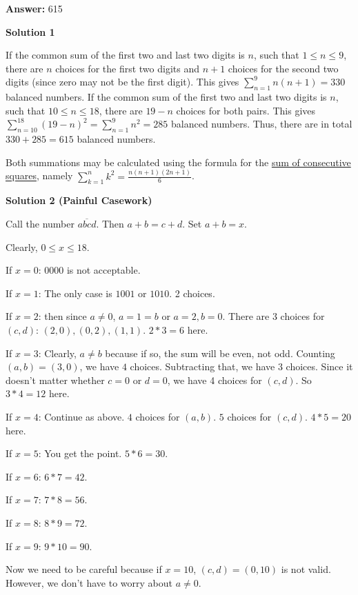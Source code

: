 \begin{enumerate}
 
 \textbf{Answer: }615



\textbf{Solution 1}

If the common sum of the first two and last two digits is $n$, such that $1 \leq n \leq 9$, there are $n$ choices for the first two digits and $n + 1$ choices for the second two digits (since zero may not be the first digit).  This gives $\sum_{n = 1}^9 n(n + 1) = 330$ balanced numbers.  If the common sum of the first two and last two digits is $n$, such that $10 \leq n \leq 18$, there are $19 - n$ choices for both pairs.  This gives $\sum_{n = 10}^{18} (19 - n)^2 = \sum_{n = 1}^9 n^2 = 285$ balanced numbers.  Thus, there are in total $330 + 285 = \boxed{615}$ balanced numbers.

 Both summations may be calculated using the formula for the \href{https://artofproblemsolving.com/wiki/index.php?title=Perfect\_square}{sum of consecutive squares}, namely $\sum_{k=1}^n k^2 = \frac{n(n+1)(2n+1)}{6}$.

 



\textbf{Solution 2 (Painful Casework)}

Call the number $\overline{abcd}$. Then $a+b=c+d$. Set $a+b=x$.

 Clearly, $0\le x \le18$.

 If $x=0$: $0000$ is not acceptable.

 If $x=1$: The only case is $1001$ or $1010$. 2 choices.

 If $x=2$: then since $a\neq0$, $a=1=b$ or $a=2, b=0$. There are 3 choices for $(c,d)$: $(2,0), (0, 2), (1, 1)$. $2*3=6$ here.

 If $x=3$: Clearly, $a\neq b$ because if so, the sum will be even, not odd. Counting $(a,b)=(3,0)$, we have $4$ choices. Subtracting that, we have $3$ choices. Since it doesn't matter whether $c=0$ or $d=0$, we have 4 choices for $(c,d)$. So $3*4=12$ here.

 If $x=4$: Continue as above. $4$ choices for $(a,b)$. $5$ choices for $(c,d)$. $4*5=20$ here.

 If $x=5$: You get the point. $5*6=30$.

 If $x=6$: $6*7=42$.

 If $x=7$: $7*8=56$.

 If $x=8$: $8*9=72$.

 If $x=9$: $9*10=90$.

 Now we need to be careful because if $x=10$, $(c,d)=(0,10)$ is not valid. However, we don't have to worry about $a\neq0$.


\end{enumerate}
